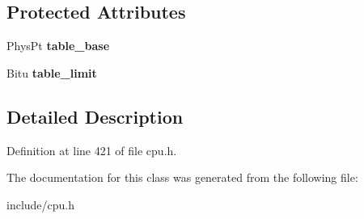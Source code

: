\subsection*{Protected Attributes}
\begin{DoxyCompactItemize}
\item 
\hypertarget{classDescriptorTable_a98077958af230be31af60525318ee702}{Phys\-Pt {\bfseries table\-\_\-base}}\label{classDescriptorTable_a98077958af230be31af60525318ee702}

\item 
\hypertarget{classDescriptorTable_aee4c9d381d9092de9af52396044bbd72}{Bitu {\bfseries table\-\_\-limit}}\label{classDescriptorTable_aee4c9d381d9092de9af52396044bbd72}

\end{DoxyCompactItemize}


\subsection{Detailed Description}


Definition at line 421 of file cpu.\-h.



The documentation for this class was generated from the following file\-:\begin{DoxyCompactItemize}
\item 
include/cpu.\-h\end{DoxyCompactItemize}
